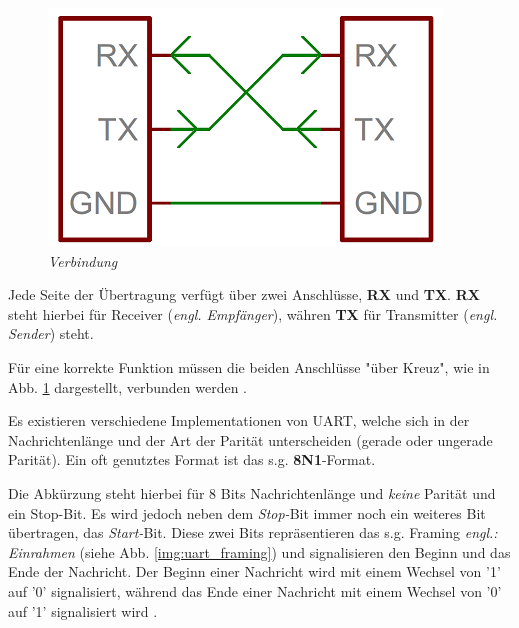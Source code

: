 \begin{figure}
     \vspace{-\baselineskip}
         \centering
         \includegraphics[scale=0.45]{Pictures/uart_rx_tx.png}
         \caption{\textit{Verbindung \citep{ImgRXTX}}}
         \label{img:uart_rxtx}
 \end{figure}


Jede Seite der Übertragung verfügt über zwei Anschlüsse, \textbf{RX} und \textbf{TX}. \textbf{RX} steht hierbei
für Receiver (\textit{engl. Empfänger}), währen \textbf{TX} für Transmitter (\textit{engl. Sender}) steht.

Für eine korrekte Funktion müssen die beiden Anschlüsse "über Kreuz", wie in Abb. \ref{img:uart_rxtx} dargestellt, verbunden werden \citep{Mikroprozessortechnik}.

\smallskip

Es existieren verschiedene Implementationen von \ac{UART}, welche sich in der Nachrichtenlänge und der Art der
Parität unterscheiden (gerade oder ungerade Parität). Ein oft genutztes Format ist das s.g. \textbf{8N1}-Format.

\smallskip


Die Abkürzung steht hierbei für 8 Bits Nachrichtenlänge und \textit{keine} Parität und ein Stop-Bit. Es wird jedoch neben dem \textit{Stop-}Bit
immer noch ein weiteres Bit übertragen, das \textit{Start-}Bit. Diese zwei Bits repräsentieren das s.g. Framing \textit{engl.: Einrahmen} 
(siehe Abb. \ref{img:uart_framing}) und signalisieren den Beginn und das Ende der Nachricht. Der Beginn einer Nachricht wird mit einem 
Wechsel von '1' auf '0' signalisiert, während das Ende einer Nachricht mit einem Wechsel von '0' auf '1' signalisiert wird \citep{Mikroprozessortechnik}. 


